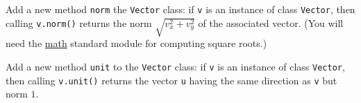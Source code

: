 \documentclass[english,serif,mathserif,xcolor=pdftex,dvipsnames,table]{beamer}
\begin{document}






\begin{frame}[fragile]
  \begin{exercise}
    Add a new method \texttt{norm} the \texttt{Vector} class: if
    \texttt{v} is an instance of class \texttt{Vector}, then calling
    \texttt{v.norm()} returns the norm $\sqrt{v_x^2 + v_y^2}$ of
    the associated vector.
    (You will need the
    \href{http://docs.python.org/2/library/math.html}{math} standard
    module for computing square roots.)
  \end{exercise}

  \+
  \begin{exercise}
    Add a new method \texttt{unit} to the \texttt{Vector} class: if
    \texttt{v} is an instance of class \texttt{Vector}, then calling
    \texttt{v.unit()} returns the vector \texttt{u} having the
    same direction as \texttt{v} but norm $1$.
  \end{exercise}
\end{frame}
\end{document}
